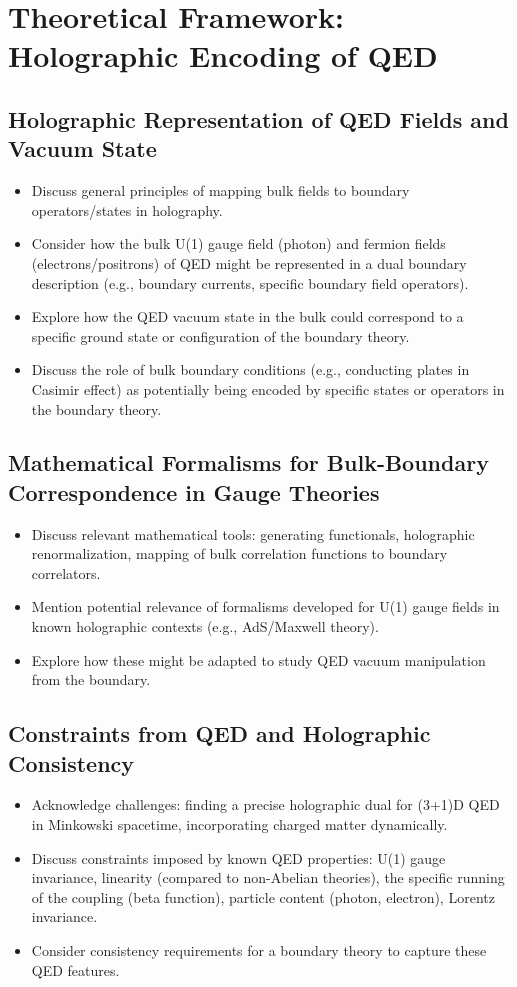 \documentclass{amsart}
\begin{document}
\section{Theoretical Framework: Holographic Encoding of QED}

\subsection{Holographic Representation of QED Fields and Vacuum State}
\begin{itemize}
    \item Discuss general principles of mapping bulk fields to boundary operators/states in holography.
    \item Consider how the bulk U(1) gauge field (photon) and fermion fields (electrons/positrons) of QED might be represented in a dual boundary description (e.g., boundary currents, specific boundary field operators).
    \item Explore how the QED vacuum state in the bulk could correspond to a specific ground state or configuration of the boundary theory.
    \item Discuss the role of bulk boundary conditions (e.g., conducting plates in Casimir effect) as potentially being encoded by specific states or operators in the boundary theory.
\end{itemize}

\subsection{Mathematical Formalisms for Bulk-Boundary Correspondence in Gauge Theories}
\begin{itemize}
    \item Discuss relevant mathematical tools: generating functionals, holographic renormalization, mapping of bulk correlation functions to boundary correlators.
    \item Mention potential relevance of formalisms developed for U(1) gauge fields in known holographic contexts (e.g., AdS/Maxwell theory).
    \item Explore how these might be adapted to study QED vacuum manipulation from the boundary.
\end{itemize}

\subsection{Constraints from QED and Holographic Consistency}
\begin{itemize}
    \item Acknowledge challenges: finding a precise holographic dual for (3+1)D QED in Minkowski spacetime, incorporating charged matter dynamically.
    \item Discuss constraints imposed by known QED properties: U(1) gauge invariance, linearity (compared to non-Abelian theories), the specific running of the coupling (beta function), particle content (photon, electron), Lorentz invariance.
    \item Consider consistency requirements for a boundary theory to capture these QED features.
\end{itemize}
\end{document}
